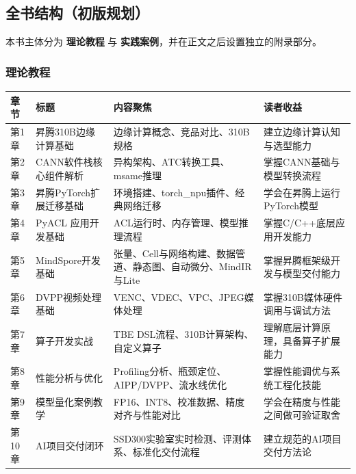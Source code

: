 \subsection*{全书结构（初版规划）}\label{src-book-README-h3}

本书主体分为 \textbf{理论教程} 与
\textbf{实践案例}，并在正文之后设置独立的附录部分。

\subsubsection*{理论教程}\label{src-book-README-h4}

\begin{longtable}[]{@{}
  >{\raggedright\arraybackslash}p{}
  >{\raggedright\arraybackslash}p{}
  >{\raggedright\arraybackslash}p{}
  >{\raggedright\arraybackslash}p{}@{}}
\toprule\noalign{}
\begin{minipage}[b]{\linewidth}\raggedright
章节
\end{minipage} & \begin{minipage}[b]{\linewidth}\raggedright
标题
\end{minipage} & \begin{minipage}[b]{\linewidth}\raggedright
内容聚焦
\end{minipage} & \begin{minipage}[b]{\linewidth}\raggedright
读者收益
\end{minipage} \\
\midrule\noalign{}
\endhead
\bottomrule\noalign{}
\endlastfoot
第1章 & 昇腾310B边缘计算基础 & 边缘计算概念、竞品对比、310B规格 &
建立边缘计算认知与选型能力 \\
第2章 & CANN软件栈核心组件解析 & 异构架构、ATC转换工具、msame推理 &
掌握CANN基础与模型转换流程 \\
第3章 & 昇腾PyTorch扩展迁移基础 & 环境搭建、torch\_npu插件、经典网络迁移
& 学会在昇腾上运行PyTorch模型 \\
第4章 & PyACL 应用开发基础 & ACL运行时、内存管理、模型推理流程 &
掌握C/C++底层应用开发能力 \\
第5章 & MindSpore开发基础 &
张量、Cell与网络构建、数据管道、静态图、自动微分、MindIR与Lite &
掌握昇腾框架级开发与模型交付能力 \\
第6章 & DVPP视频处理基础 & VENC、VDEC、VPC、JPEG媒体处理 &
掌握310B媒体硬件调用与调试方法 \\
第7章 & 算子开发实战 & TBE DSL流程、310B计算架构、自定义算子 &
理解底层计算原理，具备算子扩展能力 \\
第8章 & 性能分析与优化 & Profiling分析、瓶颈定位、AIPP/DVPP、流水线优化
& 掌握性能调优与系统工程化技能 \\
第9章 & 模型量化案例教学 & FP16、INT8、校准数据、精度对齐与性能对比 &
学会在精度与性能之间做可验证取舍 \\
第10章 & AI项目交付闭环 & SSD300实验室实时检测、评测体系、标准化交付流程
& 建立规范的AI项目交付方法论 \\
\end{longtable}

